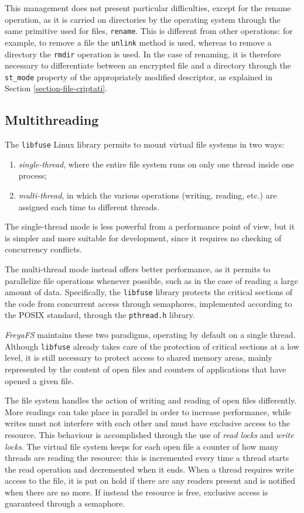 \documentclass[a4paper,12pt,twoside,openright]{report}
\begin{document}
  This management does not present particular difficulties, except for the rename operation,
  as it is carried on directories by the operating system through the same primitive
  used for files, \texttt{rename}.
  This is different from other operations: for example, to remove a file the \texttt{unlink} method
  is used, whereas to remove a directory the \texttt{rmdir} operation is used.
  In the case of renaming, it is therefore necessary to differentiate between an encrypted file and a directory
  through the \texttt{st\_mode} property of the appropriately modified descriptor, as explained in Section \ref{section-file-criptati}.

  \subsection{Multithreading}

  The \texttt{libfuse} Linux library permits to mount virtual file systems in two ways:
  \begin{enumerate}
    \item \textit{single-thread}, where the entire file system runs on only one thread inside one process;
    \item \textit{multi-thread}, in which the various operations (writing, reading, etc.) are assigned each time to different threads.
  \end{enumerate}

  The single-thread mode is less powerful from a performance point of view, but it is simpler
  and more suitable for development, since it requires no checking of concurrency conflicts.

  The multi-thread mode instead offers better performance, as it permits to parallelize file operations
  whenever possible, such as in the case of reading a large amount of data.
  Specifically, the \texttt{libfuse} library protects the critical sections of the code from concurrent
  access through semaphores, implemented according to the POSIX standard, through the \texttt{pthread.h} library.

  \textit{FreyaFS} maintains these two paradigms, operating by default on a single thread.
  Although \texttt{libfuse} already takes care of the protection of critical sections at a low level,
  it is still necessary to protect access to shared memory areas, mainly represented by the content of
  open files and counters of applications that have opened a given file.

  The file system handles the action of writing and reading of open files differently.
  More readings can take place in parallel in order to increase performance, while writes must
  not interfere with each other and must have exclusive access to the resource.
  This behaviour is accomplished through the use of \textit{read locks} and \textit{write locks}.
  The virtual file system keeps for each open file a counter of how many threads are reading the resource:
  this is incremented every time a thread starts the read operation and decremented when it ends.
  When a thread requires write access to the file, it is put on hold if there are any readers present
  and is notified when there are no more. If instead the resource is free, exclusive access is guaranteed
  through a semaphore.
\end{document}
